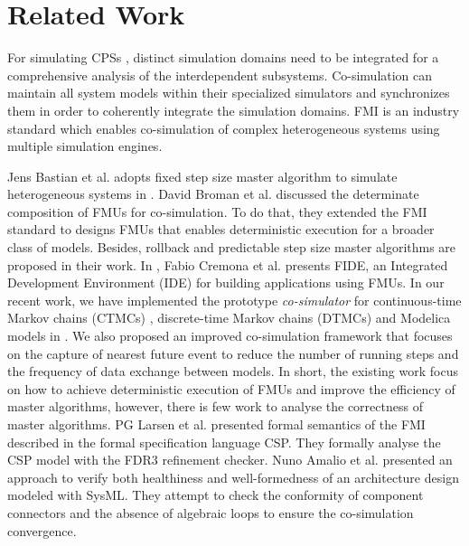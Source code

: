 \section{Related Work}
\label{sec:relateworks}
For simulating CPSs \cite{GeorgMRW14}, distinct
simulation domains need to be integrated for a comprehensive
analysis of the interdependent subsystems. Co-simulation \cite{Bogomolov2015Co} can maintain all system models within their specialized simulators
and synchronizes them in order to coherently integrate the simulation domains. FMI \cite{Blochwitz2011The}\cite{FMI2INTRO} is an industry standard which enables co-simulation of complex heterogeneous systems using multiple simulation engines. 

Jens Bastian et al. adopts fixed step size master algorithm to simulate heterogeneous
systems in \cite{Bastian2011Master}.
David Broman et al. discussed the determinate composition of FMUs for co-simulation. To do that, they extended the FMI standard to designs FMUs that enables deterministic execution for a broader class of models. Besides, rollback and predictable step size master algorithms are proposed in their work. In \cite{CremonaLTBL16}, Fabio Cremona et al. presents FIDE, an Integrated Development Environment
(IDE) for building applications using FMUs. In our recent work, we have implemented the prototype \textit{co-simulator} for continuous-time Markov chains (CTMCs) \cite{DanosHGS17}, discrete-time Markov chains (DTMCs) \cite{Guerry13} and Modelica models in \cite{LiuJWCD16}. We also proposed an improved co-simulation framework that focuses on the capture of nearest future event to reduce the number of running steps and the frequency of data exchange between models. 
In short, the existing work focus on how to achieve deterministic execution of FMUs and improve the efficiency of master algorithms, however, there is few work to analyse the correctness of master algorithms. PG Larsen et al. \cite{Larsen2016Integrated} presented formal semantics of the FMI described in the formal specification language CSP. They 
formally analyse the CSP model with the FDR3 refinement checker. Nuno Amalio et al. \cite{AmalioPCW16} presented an approach to verify both healthiness and well-formedness of an architecture design modeled with SysML. They attempt to check the conformity of component connectors and the absence of algebraic loops to ensure the co-simulation convergence.

